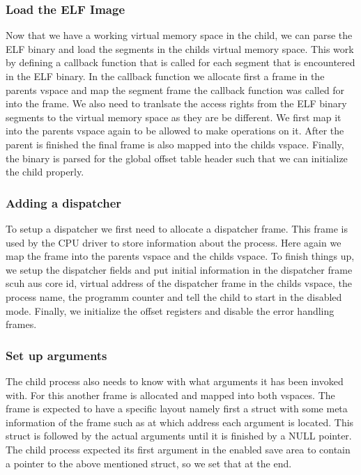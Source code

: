 \subsubsection{Load the ELF Image}
Now that we have a working virtual memory space in the child, we can parse the ELF binary and load the segments in the childs virtual memory space. This work by defining a callback function that is called for each segment that is encountered in the ELF binary.
In the callback function we allocate first a frame in the parents vspace and map the segment frame the callback function was called for into the frame. We also need to tranlsate the access rights from the ELF binary segments to the virtual memory space as they are be different. We first map it into the parents vspace again to be allowed to make operations on it. After the parent is finished the final frame is also mapped into the childs vspace.
Finally, the binary is parsed for the global offset table header such that we can initialize the child properly.

\subsubsection{Adding a dispatcher}
To setup a dispatcher we first need to allocate a dispatcher frame. This frame is used by the CPU driver to store information about the process.
Here again we map the frame into the parents vspace and the childs vspace.
To finish things up, we setup the dispatcher fields and put initial information in the dispatcher frame scuh aus core id, virtual address of the dispatcher frame in the childs vspace, the process name, the programm counter and tell the child to start in the disabled mode.
Finally, we initialize the offset registers and disable the error handling frames.

\subsubsection{Set up arguments}
The child process also needs to know with what arguments it has been invoked with. For this another frame is allocated and mapped into both vspaces.
The frame is expected to have a specific layout namely first a struct with some meta information of the frame such as at which address each argument is located.
This struct is followed by the actual arguments until it is finished by a NULL pointer.
The child process expected its first argument in the enabled save area to contain a pointer to the above mentioned struct, so we set that at the end.

